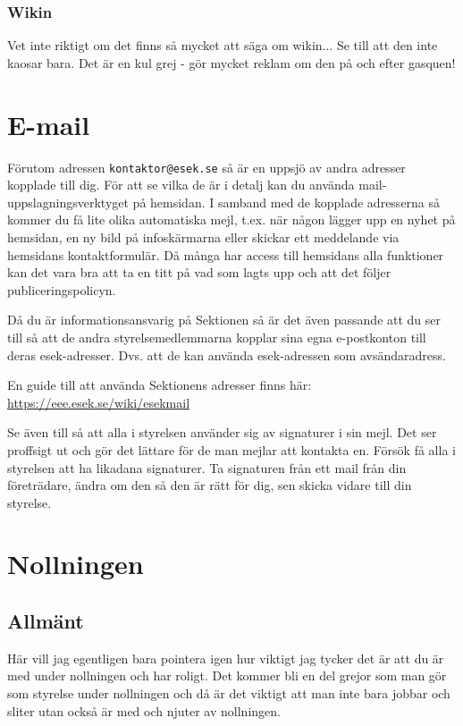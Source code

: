 \documentclass[10pt]{article}
\begin{document}
\subsubsection{Wikin}
Vet inte riktigt om det finns så mycket att säga om wikin... Se till att den inte kaosar bara. Det är en kul grej - gör mycket reklam om den på och efter gasquen!

\section{E-mail}
Förutom adressen \texttt{kontaktor@esek.se} så är en uppsjö av andra adresser kopplade till dig. För att se vilka de är i detalj kan du använda mail-uppslagningsverktyget på hemsidan. I samband med de kopplade adresserna så kommer du få lite olika automatiska mejl, t.ex. när någon lägger upp en nyhet på hemsidan, en ny bild på infoskärmarna eller skickar ett meddelande via hemsidans kontaktformulär. Då många har access till hemsidans alla funktioner kan det vara bra att ta en titt på vad som lagts upp och att det följer publiceringspolicyn.

Då du är informationsansvarig på Sektionen så är det även passande att du ser till så att de andra styrelsemedlemmarna kopplar sina egna e-postkonton till deras esek-adresser. Dvs. att de kan använda esek-adressen som avsändaradress.

En guide till att använda Sektionens adresser finns här: \url{https://eee.esek.se/wiki/esekmail}

Se även till så att alla i styrelsen använder sig av signaturer i sin mejl. Det ser proffsigt ut och gör det lättare för de man mejlar att kontakta en. Försök få alla i styrelsen att ha likadana signaturer. Ta signaturen från ett mail från din företrädare, ändra om den så den är rätt för dig, sen skicka vidare till din styrelse.

\section{Nollningen}
\subsection{Allmänt}
Här vill jag egentligen bara pointera igen hur viktigt jag tycker det är att du är med under nollningen och har roligt. Det kommer bli en del grejor som man gör som styrelse under nollningen och då är det viktigt att man inte bara jobbar och sliter utan också är med och njuter av nollningen.
\end{document}
